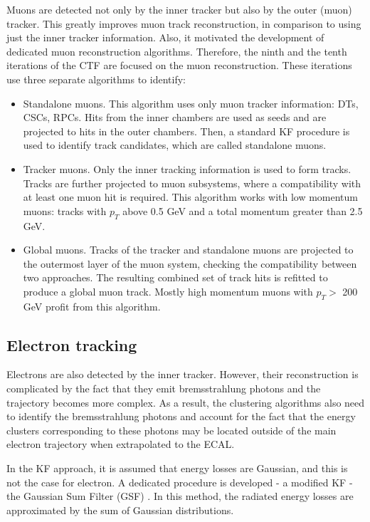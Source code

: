 Muons are detected not only by the inner tracker but also by the outer (muon) tracker. This greatly improves muon track reconstruction, in comparison to using just the inner tracker information. Also, it motivated the development of dedicated muon reconstruction algorithms. Therefore, the ninth and the tenth iterations of the CTF are focused on the muon reconstruction. These iterations use three separate algorithms to identify: 

\begin{itemize}
\item Standalone muons. This algorithm uses only muon tracker information: DTs, CSCs, RPCs. Hits from the inner chambers are used as seeds and are projected to hits in the outer chambers. Then, a standard KF procedure is used to identify track candidates, which are called standalone muons.
\item Tracker muons. Only the inner tracking information is used to form tracks. Tracks are further projected to muon subsystems, where a compatibility with at least one muon hit is required. This algorithm works with low momentum muons: tracks with $p_T$ above 0.5 GeV and a total momentum greater than 2.5 GeV.
\item Global muons. Tracks of the tracker and standalone muons are projected to the outermost layer of the muon system, checking the compatibility between two approaches. The resulting combined set of track hits is refitted to produce a global muon track. Mostly high momentum muons with $p_T > $ 200 GeV profit from this algorithm.
\end{itemize}

\subsection{Electron tracking}\label{sec:ele_track_reconstruction}
Electrons are also detected by the inner tracker. However, their reconstruction is complicated by the fact that they emit bremsstrahlung photons and the trajectory becomes more complex. As a result, the clustering algorithms also need to identify the bremsstrahlung photons and account for the fact that the energy clusters corresponding to these photons may be located outside of the main electron trajectory when extrapolated to the ECAL. 

In the KF approach, it is assumed that energy losses are Gaussian, and this is not the case for electron. A dedicated procedure is developed - a modified KF - the Gaussian Sum Filter (GSF) \cite{GSF}. In this method, the radiated energy losses are approximated by the sum of Gaussian distributions. 


